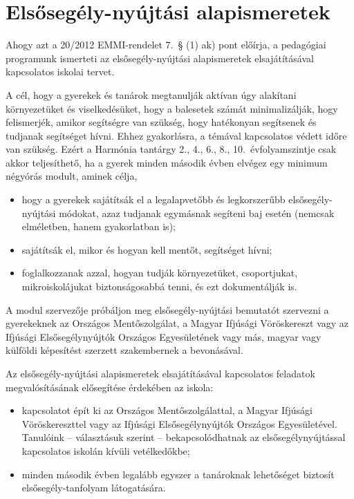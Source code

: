 \section{Elsősegély-nyújtási alapismeretek}
\label{sec:elsosegely}
Ahogy azt a 20/2012 EMMI-rendelet 7.~§ (1) ak) pont előírja, a pedagógiai programunk ismerteti az elsősegély-nyújtási alapismeretek elsajátításával kapcsolatos iskolai tervet.

A cél, hogy a gyerekek és tanárok megtanulják aktívan úgy alakítani környezetüket és viselkedésüket, hogy a balesetek számát minimalizálják, hogy felismerjék, amikor segítségre van szükség, hogy hatékonyan segítsenek és tudjanak segítséget hívni. Ehhez gyakorlásra, a témával kapcsolatos védett időre van szükség. Ezért a Harmónia tantárgy 2., 4., 6., 8., 10.~évfolyamszintje csak akkor teljesíthető, ha a gyerek minden második évben elvégez egy minimum négyórás modult, aminek célja,
\begin{itemize}
    \item hogy a gyerekek sajátítsák el a legalapvetőbb és legkorszerűbb elsőse\-gély-nyújtási módokat, azaz tudjanak egymásnak segíteni baj esetén (nemcsak elméletben, hanem gyakorlatban is);
    \item sajátítsák el, mikor és hogyan kell mentőt, segítséget hívni;
    \item foglalkozzanak azzal, hogyan tudják környezetüket, csoportjukat, mikroiskolájukat biztonságosabbá tenni, és ezt dokumentálják is.
\end{itemize}

A modul szervezője próbáljon meg elsősegély-nyújtási bemutatót szervezni a gyerekeknek az Országos Mentőszolgálat, a Magyar Ifjúsági Vöröskereszt vagy az Ifjúsági Elsősegélynyújtók Országos Egyesületének vagy más, magyar vagy külföldi képesítést szerzett szakembernek a bevonásával.

Az elsősegély-nyújtási alapismeretek elsajátításával kapcsolatos feladatok megvalósításának elősegítése érdekében az iskola:
\begin{itemize}
    \item kapcsolatot épít ki az Országos Mentőszolgálattal, a Magyar Ifjúsági Vöröskereszttel vagy az Ifjúsági Elsősegélynyújtók Országos Egyesületével. Tanulóink -- választásuk szerint -- bekapcsolódhatnak az elsősegélynyújtással kapcsolatos iskolán kívüli vetélkedőkbe;
    \item  minden második évben legalább egyszer a tanároknak lehetőséget biztosít elsősegély-tanfolyam látogatására.

\end{itemize}
